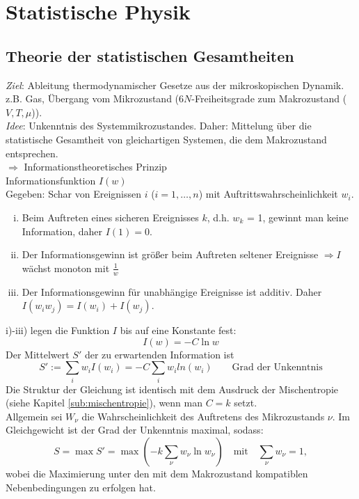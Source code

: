 \section{Statistische Physik}
\subsection{Theorie der statistischen Gesamtheiten}
\emph{Ziel}: Ableitung thermodynamischer Gesetze aus der mikroskopischen Dynamik. \\
z.B. Gas, Übergang vom Mikrozustand ($6N$-Freiheitsgrade zum Makrozustand ($V, T, \mu$)). \\
\emph{Idee}: Unkenntnis des Systemmikrozustandes. Daher: Mittelung über die statistische Gesamtheit von gleichartigen Systemen, die dem
Makrozustand entsprechen. \\
$\Rightarrow$ Informationstheoretisches Prinzip \\[\baselineskip]
Informationsfunktion $I(w)$\\
Gegeben: Schar von Ereignissen $i$ ($i=1, \ldots, n$) mit Auftrittswahrscheinlichkeit $w_i$.
\begin{enumerate}[i)]
    \item Beim Auftreten eines sicheren Ereignisses $k$, d.h. $w_k$ = 1, gewinnt man keine Information, daher $I(1)=0$.
    \item Der Informationsgewinn ist größer beim Auftreten seltener Ereignisse $\Rightarrow I$ wächst monoton mit $\frac{1}{w}$
    \item Der Informationsgewinn für unabhängige Ereignisse ist additiv. Daher $I(w_i w_j) = I(w_i)+I(w_j)$.
\end{enumerate}
i)-iii) legen die Funktion $I$ bis auf eine Konstante fest:
\begin{equation}
    I(w) = -C \ln w
\end{equation}
Der Mittelwert $S'$ der zu erwartenden Information ist
\begin{equation}
    S' := \sum_{i} w_i I(w_i) = - C \sum_i w_i ln(w_i) \qquad \text{Grad der Unkenntnis}
\end{equation}
Die Struktur der Gleichung ist identisch mit dem Ausdruck der Mischentropie (siehe Kapitel \ref{sub:mischentropie}),
wenn man $C=k$ setzt. \\[\baselineskip]
Allgemein sei $W_\nu$ die Wahrscheinlichkeit des Auftretens des Mikrozustands $\nu$. Im Gleichgewicht ist der Grad der Unkenntnis maximal,
sodass:
\begin{equation}
    S = \max S' = \max \left( -k \sum_\nu w_\nu \ln w_\nu \right) \quad \text{mit} \quad \sum_\nu w_\nu = 1,
\end{equation}
wobei die Maximierung unter den mit dem Makrozustand kompatiblen Nebenbedingungen zu erfolgen hat.

